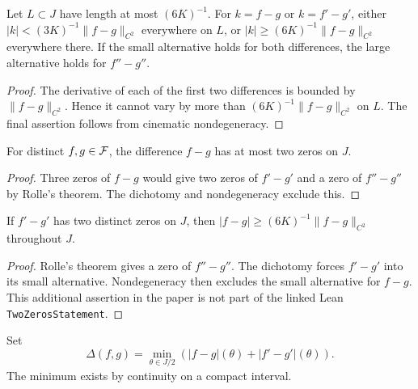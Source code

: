 \begin{lemma}
\label{lem:cinematic-dichotomy}
Let $L\subset J$ have length at most $(6K)^{-1}$. For
$k=f-g$ or $k=f'-g'$, either $|k|<(3K)^{-1}\|f-g\|_{C^2}$
everywhere on $L$, or
$|k|\geq(6K)^{-1}\|f-g\|_{C^2}$ everywhere there.
If the small alternative holds for both differences, the large
alternative holds for $f''-g''$.
\end{lemma}
\begin{proof}
The derivative of each of the first two differences is bounded by
$\|f-g\|_{C^2}$. Hence it cannot vary by more than
$(6K)^{-1}\|f-g\|_{C^2}$ on $L$. The final assertion follows
from cinematic nondegeneracy.
\end{proof}

\begin{lemma}
\label{lem:two-zeros}
\leanok
{}
For distinct $f,g\in\mathcal{F}$, the difference $f-g$ has at most
two zeros on $J$.
\end{lemma}
\begin{proof}
\leanok
Three zeros of $f-g$ would give two zeros of $f'-g'$ and a
zero of $f''-g''$ by Rolle's theorem. The dichotomy and
nondegeneracy exclude this.
\end{proof}

\begin{lemma}
\label{lem:two-derivative-zeros}
If $f'-g'$ has two distinct zeros on $J$, then
$|f-g|\geq(6K)^{-1}\|f-g\|_{C^2}$ throughout $J$.
\end{lemma}
\begin{proof}
Rolle's theorem gives a zero of $f''-g''$. The dichotomy forces
$f'-g'$ into its small alternative. Nondegeneracy then excludes
the small alternative for $f-g$. This additional assertion in the
paper is not part of the linked Lean \texttt{TwoZerosStatement}.
\end{proof}

\begin{definition}
\label{def:tangency-parameter}
\leanok
Set
\[
          \Delta(f,g)=\min_{\theta\in J/2}
                        (|f-g|(\theta)+|f'-g'|(\theta)).
\]
The minimum exists by continuity on a compact interval.
\end{definition}


